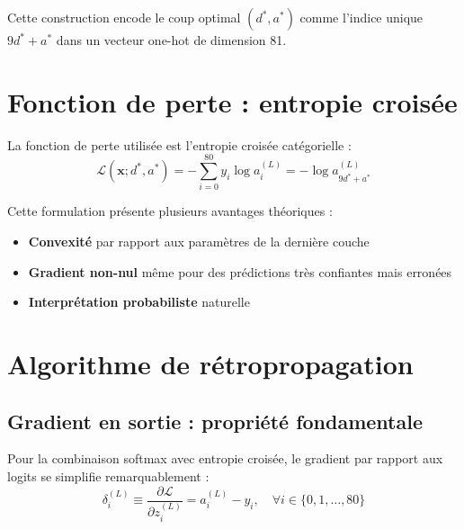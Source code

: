\documentclass[12pt,a4paper]{report}
\numberwithin{equation}{section}
\begin{document}
Cette construction encode le coup optimal $(d^*, a^*)$ comme l'indice unique $9d^* + a^*$ dans un vecteur one-hot de dimension 81.

\section{Fonction de perte : entropie croisée}

\begin{definition}
La fonction de perte utilisée est l'entropie croisée catégorielle :
$$\mathcal{L}(\mathbf{x}; d^*, a^*) = -\sum_{i=0}^{80} y_i \log a^{(L)}_i = -\log a^{(L)}_{9d^* + a^*}$$
\end{definition}

Cette formulation présente plusieurs avantages théoriques :
\begin{itemize}
  \item \textbf{Convexité} par rapport aux paramètres de la dernière couche
  \item \textbf{Gradient non-nul} même pour des prédictions très confiantes mais erronées
  \item \textbf{Interprétation probabiliste} naturelle
\end{itemize}

\section{Algorithme de rétropropagation}

\subsection{Gradient en sortie : propriété fondamentale}

\begin{theorem}
Pour la combinaison softmax avec entropie croisée, le gradient par rapport aux logits se simplifie remarquablement :
$$\delta^{(L)}_i \equiv \frac{\partial \mathcal{L}}{\partial z^{(L)}_i} = a^{(L)}_i - y_i, \quad \forall i \in \{0, 1, \ldots, 80\}$$
\end{theorem}
\end{document}
